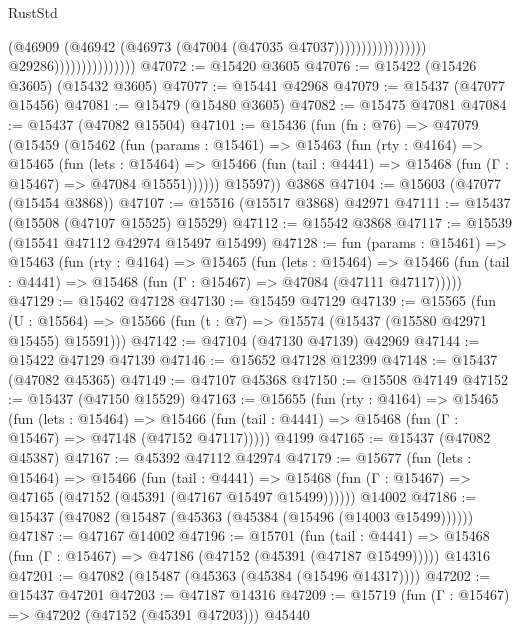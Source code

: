 \begin{lexlean}{RustStd}
\begin{coremodule}
                                                          (@46909
                                                            (@46942
                                                              (@46973
                                                                (@47004
                                                                  (@47035 @47037)))))))))))))))))
                                  @29286)))))))))))))))
@47072 := @15420 @3605
@47076 := @15422 (@15426 @3605) (@15432 @3605)
@47077 := @15441 @42968
@47079 := @15437 (@47077 @15456)
@47081 := @15479 (@15480 @3605)
@47082 := @15475 @47081
@47084 := @15437 (@47082 @15504)
@47101 := @15436
    (fun (fn : @76) =>
    @47079
      (@15459
        (@15462
          (fun (params : @15461) =>
          @15463
            (fun (rty : @4164) =>
            @15465
              (fun (lets : @15464) =>
              @15466 (fun (tail : @4441) => @15468 (fun (Γ : @15467) => @47084 @15551))))))
        @15597))
    @3868
@47104 := @15603 (@47077 (@15454 @3868))
@47107 := @15516 (@15517 @3868) @42971
@47111 := @15437 (@15508 (@47107 @15525) @15529)
@47112 := @15542 @3868
@47117 := @15539 (@15541 @47112 @42974 @15497 @15499)
@47128 := fun (params : @15461) =>
  @15463
    (fun (rty : @4164) =>
    @15465
      (fun (lets : @15464) =>
      @15466 (fun (tail : @4441) => @15468 (fun (Γ : @15467) => @47084 (@47111 @47117)))))
@47129 := @15462 @47128
@47130 := @15459 @47129
@47139 := @15565
    (fun (U : @15564) => @15566 (fun (t : @7) => @15574 (@15437 (@15580 @42971 @15455) @15591)))
@47142 := @47104 (@47130 @47139) @42969
@47144 := @15422 @47129 @47139
@47146 := @15652 @47128 @12399
@47148 := @15437 (@47082 @45365)
@47149 := @47107 @45368
@47150 := @15508 @47149
@47152 := @15437 (@47150 @15529)
@47163 := @15655
    (fun (rty : @4164) =>
    @15465
      (fun (lets : @15464) =>
      @15466 (fun (tail : @4441) => @15468 (fun (Γ : @15467) => @47148 (@47152 @47117)))))
    @4199
@47165 := @15437 (@47082 @45387)
@47167 := @45392 @47112 @42974
@47179 := @15677
    (fun (lets : @15464) =>
    @15466
      (fun (tail : @4441) =>
      @15468 (fun (Γ : @15467) => @47165 (@47152 (@45391 (@47167 @15497 @15499))))))
    @14002
@47186 := @15437 (@47082 (@15487 (@45363 (@45384 (@15496 (@14003 @15499))))))
@47187 := @47167 @14002
@47196 := @15701
    (fun (tail : @4441) => @15468 (fun (Γ : @15467) => @47186 (@47152 (@45391 (@47187 @15499)))))
    @14316
@47201 := @47082 (@15487 (@45363 (@45384 (@15496 @14317))))
@47202 := @15437 @47201
@47203 := @47187 @14316
@47209 := @15719 (fun (Γ : @15467) => @47202 (@47152 (@45391 @47203))) @45440

\end{coremodule}
\end{lexlean}
